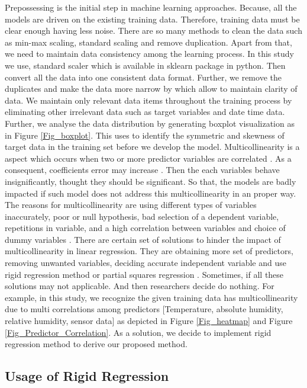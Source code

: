 Prepossessing is the initial step in machine learning approaches.
Because, all the models are driven on the existing training data. 
Therefore, training data must be clear enough having less noise.
There are so many methods to clean the data such as min-max scaling,
standard scaling and remove duplication.
Apart from that, we need to maintain data consistency among the learning process.
In this study we use, standard scaler which is available in sklearn package in python.
Then convert all the data into one consistent data format.
Further, we remove the duplicates and 
make the data more narrow by which allow to maintain clarity of data.
We maintain only relevant data items throughout the training process 
by eliminating other irrelevant data such as target variables and date time data.
Further, we analyse the data distribution 
by generating boxplot visualization as in Figure \ref{Fig_boxplot}.
This uses to identify the symmetric 
and skewness of target data in the training set before we develop the model.
Multicollinearity is a aspect which 
occurs when two or more predictor variables are correlated \cite{uyanik2013study}. 
As a consequent, coefficients error may increase \cite{uyanik2013study}.
Then the each variables behave insignificantly, 
thought they should be significant. 
So that, the models are badly impacted 
if such model does not address this multicollinearity in an proper way.
The reasons for multicollinearity are using different 
types of variables inaccurately,
poor or null hypothesis, bad selection of a dependent variable, 
repetitions in variable, and 
a high correlation between variables and 
choice of dummy variables \cite{farrar1967multicollinearity}.
There are certain set of solutions to 
hinder the impact of multicollinearity in linear regression.
They are obtaining more set of predictors, removing 
unwanted variables, deciding accurate independent variable 
and use rigid regression method or partial squares regression \cite{farrar1967multicollinearity}.
Sometimes, if all these solutions may not applicable.
And then researchers decide do nothing.
For example, in this study, 
we recognize the given training data has multicollinearity due to multi 
correlations among predictors [Temperature, absolute humidity, relative humidity, sensor data] 
as depicted in Figure \ref{Fig_heatmap} and Figure \ref{Fig_Predictor_Correlation}.
As a solution, we decide to implement rigid regression method 
to derive our proposed method.


\subsection{Usage of Rigid Regression}

